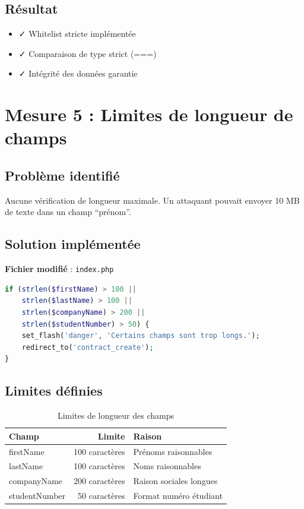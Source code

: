 \documentclass[11pt,a4paper,french]{report}
\begin{document}
\subsection{Résultat}

\begin{itemize}
    \item ✓ Whitelist stricte implémentée
    \item ✓ Comparaison de type strict (===)
    \item ✓ Intégrité des données garantie
\end{itemize}

\newpage

\section{Mesure 5 : Limites de longueur de champs}

\subsection{Problème identifié}

Aucune vérification de longueur maximale. Un attaquant pouvait envoyer 10 MB de texte 
dans un champ ``prénom''.

\subsection{Solution implémentée}

\textbf{Fichier modifié} : \texttt{index.php}

\begin{lstlisting}[language=PHP]
if (strlen($firstName) > 100 || 
    strlen($lastName) > 100 || 
    strlen($companyName) > 200 || 
    strlen($studentNumber) > 50) {
    set_flash('danger', 'Certains champs sont trop longs.');
    redirect_to('contract_create');
}
\end{lstlisting}

\subsection{Limites définies}

\begin{table}[H]
\centering
\caption{Limites de longueur des champs}
\begin{tabular}{|l|r|l|}
\hline
\textbf{Champ} & \textbf{Limite} & \textbf{Raison} \\
\hline
firstName & 100 caractères & Prénoms raisonnables \\
\hline
lastName & 100 caractères & Noms raisonnables \\
\hline
companyName & 200 caractères & Raison sociales longues \\
\hline
studentNumber & 50 caractères & Format numéro étudiant \\
\hline
\end{tabular}
\end{table}
\end{document}
